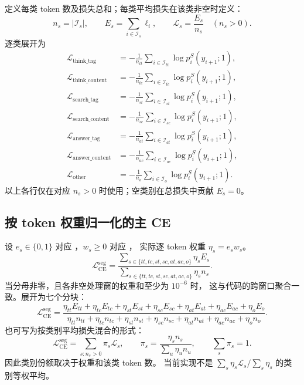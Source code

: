 \documentclass[UTF8,a4paper,11pt]{ctexart}
\newcommand{\CE}{\mathcal{L}_{\mathrm{CE}}}
\newcommand{\cfg}[1]{\texttt{\detokenize{#1}}}
\begin{document}
定义每类 token 数及损失总和；每类平均损失在该类非空时定义：
\begin{equation}
n_s=|\mathcal{I}_s|,\qquad
E_s=\sum_{i\in\mathcal{I}_s}\ell_i,\qquad
\mathcal{L}_s=\frac{E_s}{n_s}\quad(n_s>0).
\end{equation}
逐类展开为
\begin{align}
\mathcal{L}_{\mathrm{think\_tag}}
&=-\frac{1}{n_{tt}}\sum_{i\in\mathcal{I}_{tt}}\log p_i^S(y_{i+1};1),\\
\mathcal{L}_{\mathrm{think\_content}}
&=-\frac{1}{n_{tc}}\sum_{i\in\mathcal{I}_{tc}}\log p_i^S(y_{i+1};1),\\
\mathcal{L}_{\mathrm{search\_tag}}
&=-\frac{1}{n_{st}}\sum_{i\in\mathcal{I}_{st}}\log p_i^S(y_{i+1};1),\\
\mathcal{L}_{\mathrm{search\_content}}
&=-\frac{1}{n_{sc}}\sum_{i\in\mathcal{I}_{sc}}\log p_i^S(y_{i+1};1),\\
\mathcal{L}_{\mathrm{answer\_tag}}
&=-\frac{1}{n_{at}}\sum_{i\in\mathcal{I}_{at}}\log p_i^S(y_{i+1};1),\\
\mathcal{L}_{\mathrm{answer\_content}}
&=-\frac{1}{n_{ac}}\sum_{i\in\mathcal{I}_{ac}}\log p_i^S(y_{i+1};1),\\
\mathcal{L}_{\mathrm{other}}
&=-\frac{1}{n_o}\sum_{i\in\mathcal{I}_o}\log p_i^S(y_{i+1};1).
\end{align}
以上各行仅在对应 $n_s>0$ 时使用；空类别在总损失中贡献 $E_s=0$。

\subsection{按 token 权重归一化的主 CE}

设 $e_s\in\{0,1\}$ 对应 \cfg{enabled}，$w_s\geq0$ 对应 \cfg{weight}，
实际逐 token 权重 $\eta_s=e_sw_s$。
\begin{equation}\label{eq:segment-ce}
\boxed{
\CE^{\mathrm{seg}}=
\frac{\displaystyle\sum_{s\in\{tt,tc,st,sc,at,ac,o\}}\eta_s E_s}
{\displaystyle\sum_{s\in\{tt,tc,st,sc,at,ac,o\}}\eta_s n_s}.
}
\end{equation}
当分母非零，且各非空处理窗的权重和至少为 $10^{-6}$ 时，
这与代码的跨窗口聚合一致。展开为七个分块：
\begin{equation}
\boxed{
\CE^{\mathrm{seg}}=
\frac{
\eta_{tt}E_{tt}+\eta_{tc}E_{tc}+\eta_{st}E_{st}+\eta_{sc}E_{sc}
+\eta_{at}E_{at}+\eta_{ac}E_{ac}+\eta_oE_o
}{
\eta_{tt}n_{tt}+\eta_{tc}n_{tc}+\eta_{st}n_{st}+\eta_{sc}n_{sc}
+\eta_{at}n_{at}+\eta_{ac}n_{ac}+\eta_on_o
}.
}
\end{equation}
也可写为按类别平均损失混合的形式：
\begin{equation}
\CE^{\mathrm{seg}}
=\sum_{s:n_s>0}\pi_s\mathcal{L}_s,
\qquad
\pi_s=\frac{\eta_s n_s}{\sum_u\eta_u n_u},
\qquad \sum_s\pi_s=1.
\end{equation}
因此类别份额取决于权重和该类 token 数。
当前实现不是 $\sum_s\eta_s\mathcal{L}_s/\sum_s\eta_s$ 的类别等权平均。
\end{document}
